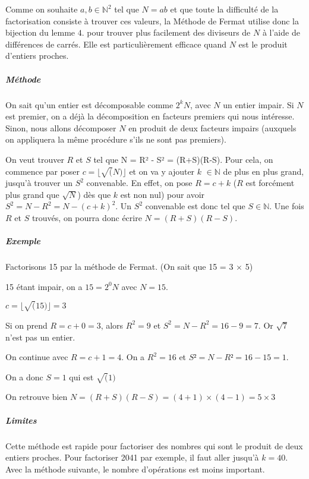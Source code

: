 \documentclass[11pt,a4paper]{article}
\begin{document}
	Comme on souhaite $a,b \in \mathbb{N}^2$ tel que $N = ab$ et que toute la difficulté de la factorisation consiste à trouver ces valeurs, la Méthode de Fermat utilise donc la bijection du lemme $4.$ pour trouver plus facilement des diviseurs de $N$ à l'aide de différences de carrés. Elle est particulièrement efficace quand $N$ est le produit d'entiers proches.
	
	\subparagraph{Méthode}
	On sait qu'un entier est décomposable comme $2^{k}N$, avec $\mathit{N}$ un entier impair. Si $\mathit{N}$ est premier, on a déjà la décomposition en facteurs premiers qui nous intéresse. Sinon, nous allons décomposer $\mathit{N}$ en produit de deux facteurs impairs (auxquels on appliquera la même procédure s'ils ne sont pas premiers). 
	
	On veut trouver $\mathit{R}$ et $\mathit{S}$ tel que N = R² - S² = (R+S)(R-S). 
	Pour cela, on commence par poser $\mathit{c = \lfloor \sqrt(N)\rfloor}$ et on va y ajouter $\mathit{k}$ $\in\mathbb{N}$ de plus en plus grand, jusqu'à trouver un $\mathit{S^2}$ convenable. En effet, on pose $\mathit{R = c + k}$ ($\mathit{R}$ est forcément plus grand que  $\mathit{\sqrt{N}}$) dès que $k$ est non nul) pour avoir
	$\mathit{S^{2} = N - R^{2} = N - (c+k)^{2}}$.
	Un $\mathit{S^2}$ convenable est donc tel que $\mathit{S} \in \mathbb{N}$. Une fois $\mathit{R}$ et $\mathit{S}$ trouvés, on pourra donc écrire $\mathit{N = (R+S)(R-S)}$.
	
	\subparagraph{Exemple}
	Factorisons 15 par la méthode de Fermat. (On sait que 15 = 3 $\times$  5)
	
	15 étant impair, on a $\mathit{15 = 2^{0}N}$ avec $\mathit{N = 15}$.
	
	$\mathit{c = \lfloor \sqrt(15)\rfloor = 3}$
	
	Si on prend $\mathit{R = c + 0 = 3}$, alors $\mathit{R^2 = 9}$ et $\mathit{S^2 = N - R^2 = 16 - 9 = 7}$. Or $\sqrt{7}$ n'est pas un entier. 
	
	On continue avec $\mathit{R = c + 1 = 4}$. On a $\mathit{R^2 = 16}$ et $\mathit{S² = N - R² = 16 - 15 = 1}$.
	
	On a donc $\mathit{S = 1}$ qui est $\sqrt(1)$
	
	On retrouve bien $\mathit{N = (R+S)(R-S) = (4+1) \times (4-1) = 5 \times 3}$
	
	\subparagraph{Limites}
	Cette méthode est rapide pour factoriser des nombres qui sont le produit de deux entiers proches. Pour factoriser 2041 par exemple, il faut aller jusqu'à $k = 40$. Avec la méthode suivante, le nombre d'opérations est moins important.
	
\end{document}
